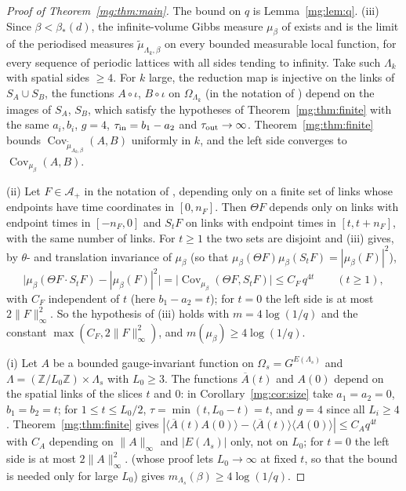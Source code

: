 \documentclass[11pt,a4paper]{article}
\theoremstyle{definition}
\theoremstyle{remark}
\DeclareMathOperator{\Cov}{Cov}
\newcommand{\Z}{\mathbb{Z}}
\newcommand{\cA}{\mathcal{A}}
\newcommand{\norm}[1]{\lVert #1\rVert}
\newcommand{\Flab}[2]{\cite[#1 \texttt{#2}]{F}}
\newcommand{\IIref}[3]{\cite[#1~`#2' (\texttt{#3})]{II}}
\newcommand{\IIlab}[2]{\cite[#1 \texttt{#2}]{II}}
\begin{document}
\begin{proof}[Proof of Theorem~\ref{mg:thm:main}]
The bound on $q$ is Lemma~\ref{mg:lem:q}.
(iii) Since $\beta<\beta_*(d)$, the infinite-volume Gibbs measure $\mu_\beta$ of \IIref{Theorem}{Uniqueness and convergence}{iv:thm:unique}
exists and is the limit of the periodised measures $\tilde\mu_{\Lambda_k,\beta}$ on every bounded measurable local function, for
every sequence of periodic lattices with all sides tending to infinity. Take such $\Lambda_k$ with spatial sides $\ge4$. For $k$ large,
the reduction map is injective on the links of $S_A\cup S_B$, the functions $A\circ\iota$, $B\circ\iota$ on $\Omega_{\Lambda_k}$ (in the notation
of \cite{II}) depend on the images of $S_A$, $S_B$, which satisfy the hypotheses of Theorem~\ref{mg:thm:finite} with the same $a_i,b_i$,
$g=4$, $\tau_{\rm in}=b_1-a_2$ and $\tau_{\rm out}\to\infty$. Theorem~\ref{mg:thm:finite} bounds
$\Cov_{\tilde\mu_{\Lambda_k,\beta}}(A,B)$ uniformly in $k$, and the left side converges to $\Cov_{\mu_\beta}(A,B)$.

(ii) Let $F\in\cA_+$ in the notation of \IIref{Definition}{Reflection, shifts, half-space algebras}{iv:def:reflection}, depending only on a
finite set of links whose endpoints have time coordinates in $[0,n_F]$. Then $\Theta F$ depends only on links with endpoint times in
$[-n_F,0]$ and $S_tF$ on links with endpoint times in $[t,t+n_F]$, with the same number of links. For $t\ge1$ the two sets are disjoint
and (iii) gives, by $\theta$- and translation invariance of $\mu_\beta$ (so that $\mu_\beta(\Theta F)\mu_\beta(S_tF)=|\mu_\beta(F)|^2$),
\[
\bigl|\mu_\beta(\Theta F\cdot S_tF)-|\mu_\beta(F)|^2\bigr|=\bigl|\Cov_{\mu_\beta}(\Theta F,S_tF)\bigr|\le C_F\,q^{4t}\qquad(t\ge1),
\]
with $C_F$ independent of $t$ (here $b_1-a_2=t$); for $t=0$ the left side is at most $2\norm F_\infty^2$. So the hypothesis of
\IIlab{Theorem}{iv:thm:OS}(iii) holds with $m=4\log(1/q)$ and the constant $\max(C_F,2\norm F_\infty^2)$, and
$m(\mu_\beta)\ge4\log(1/q)$.

(i) Let $A$ be a bounded gauge-invariant function on $\Omega_s=G^{E(\Lambda_s)}$ and $\Lambda=(\Z/L_0\Z)\times\Lambda_s$ with $L_0\ge3$.
The functions $\overline A(t)$ and $A(0)$ depend on the spatial links of the slices $t$ and $0$: in Corollary~\ref{mg:cor:size} take
$a_1=a_2=0$, $b_1=b_2=t$; for $1\le t\le L_0/2$, $\tau=\min(t,L_0-t)=t$, and $g=4$ since all $L_i\ge4$. Theorem~\ref{mg:thm:finite} gives
$|\langle\overline A(t)A(0)\rangle-\langle\overline A(t)\rangle\langle A(0)\rangle|\le C_Aq^{4t}$ with $C_A$ depending on $\norm A_\infty$ and
$|E(\Lambda_s)|$ only, not on $L_0$; for $t=0$ the left side is at most $2\norm A_\infty^2$. \Flab{Corollary}{cor:gapfromcorr} (whose proof
lets $L_0\to\infty$ at fixed $t$, so that the bound is needed only for large $L_0$) gives $m_{\Lambda_s}(\beta)\ge4\log(1/q)$.
\end{proof}
\end{document}
